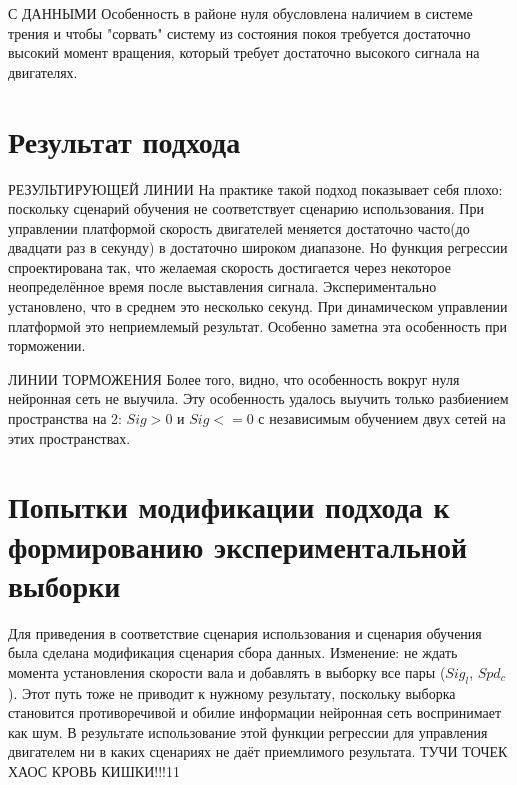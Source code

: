 \documentclass[14pt]{extreport}
\begin{document}
                { С ДАННЫМИ}
                Особенность в районе нуля обусловлена наличием в системе трения и чтобы "сорвать" систему из состояния покоя требуется достаточно высокий момент вращения, который требует достаточно высокого сигнала на двигателях.
            \section{Результат подхода}

                { РЕЗУЛЬТИРУЮЩЕЙ ЛИНИИ}
                На практике такой подход показывает себя плохо: поскольку сценарий обучения не соответствует сценарию использования. При управлении платформой скорость двигателей меняется достаточно часто(до двадцати раз в секунду) в достаточно широком диапазоне. Но функция регрессии спроектирована так, что желаемая скорость достигается через некоторое неопределённое время после выставления сигнала. Экспериментально установлено, что в среднем это несколько секунд. При динамическом управлении платформой это неприемлемый результат. Особенно заметна эта особенность при торможении.

                { ЛИНИИ ТОРМОЖЕНИЯ}
                Более того, видно, что особенность вокруг нуля нейронная сеть не выучила. Эту особенность удалось выучить только разбиением пространства на 2: $Sig>0$ и $Sig<=0$ с независимым обучением двух сетей на этих пространствах.
            \section{Попытки модификации подхода к формированию экспериментальной выборки}
                Для приведения в соответствие сценария использования и сценария обучения была сделана модификация сценария сбора данных. Изменение: не ждать момента установления скорости вала и добавлять в выборку все пары ($Sig_l$, $Spd_c$). Этот путь тоже не приводит к нужному результату, поскольку выборка становится противоречивой и обилие информации нейронная сеть воспринимает как шум. В результате использование этой функции регрессии для управления двигателем ни в каких сценариях не даёт приемлимого результата.
                { ТУЧИ ТОЧЕК ХАОС КРОВЬ КИШКИ!!!11}
\end{document}
